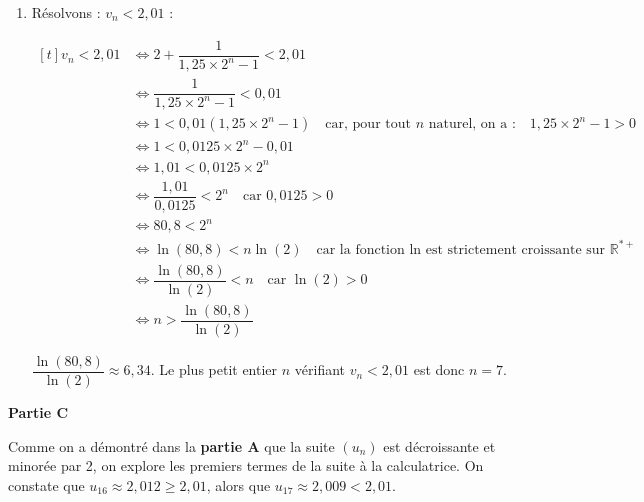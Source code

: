 \documentclass[10pt]{article}
\providecommand{\R}{\mathbb{R}}
\begin{document}
\begin{enumerate}
\begin{enumerate}
			Ce qui implique : \quad $v_n = 2 + \dfrac{1}{1,25 \times 2^n - 1}$.

			\item Comme $w_0 = 1,25 > 0$ et $q = 2 > 1$, par propriété :\quad $\lim\limits_{n \to +\infty} 1,25 \times 2^n = +\infty$.

			Par limite de la somme :\quad $\lim\limits_{n \to +\infty} 1,25 \times 2^n - 1 = +\infty$.

			Puis, par limite de l'inverse :\quad $\lim\limits_{n \to +\infty} \dfrac{1}{1,25 \times 2^n -1} = 0$.

			Finalement, par limite de la somme :\quad $\lim\limits_{n \to +\infty} v_n = 2$.
		\end{enumerate}

		\item Résolvons : $v_n < 2,01$ :

		$\begin{aligned}[t]
			v_n < 2,01 &\iff 2 + \dfrac{1}{1,25 \times 2^n - 1} < 2,01\\
			&\iff \dfrac{1}{1,25 \times 2^n - 1} < 0,01\\
			&\iff 1 < 0,01(1,25 \times 2^n - 1)\quad \text{car, pour tout $n$ naturel, on a :}\quad 1,25\times 2^n - 1 > 0\\
			&\iff 1 < 0,0125 \times 2^n - 0,01\\
			&\iff 1,01 < 0,0125 \times 2^n\\
			&\iff \dfrac{1,01}{0,0125} < 2^n\quad \text{car } 0,0125 > 0\\
			&\iff 80,8 < 2^n\\
			&\iff \ln(80,8) < n\ln(2)\quad \text{car la fonction ln est strictement croissante sur }\R^{*+}\\
			&\iff \dfrac{\ln(80,8)}{\ln(2)} < n\quad \text{car }\ln(2) > 0\\
			&\iff n > \dfrac{\ln(80,8)}{\ln(2)}\end{aligned}$

		$\dfrac{\ln(80,8)}{\ln(2)} \approx 6,34$. \quad
		Le plus petit entier $n$ vérifiant $v_n < 2,01$ est donc $n = 7$.
	\end{enumerate}

	\bigskip

	\textbf{Partie C}

	\medskip

	Comme on a démontré dans la \textbf{partie A} que la suite $(u_n)$ est décroissante et minorée par 2, on explore les premiers termes de la suite à la calculatrice. On constate que $u_{16} \approx 2,012 \geqslant 2,01$, alors que $u_{17}\approx 2,009 < 2,01$.
\end{document}
